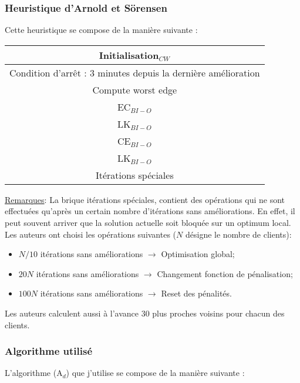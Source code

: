 \documentclass[a4paper,11pt]{article}%
\begin{document}
\subsubsection{Heuristique d'Arnold et Sörensen}

Cette heuristique se compose de la manière suivante :


\begin{center}
\begin{tabular}{|c|}

   \hline
   Initialisation$_{CW}$  \\
   \hline
   \hline
   Condition d'arrêt : 3 minutes depuis la dernière amélioration  \\
   \hline
   Compute worst edge \\
   \hline
   EC$_{BI-O}$ \\
   \hline
   LK$_{BI-O}$ \\
   \hline
   CE$_{BI-O}$ \\
   \hline
   LK$_{BI-O}$ \\
   \hline
   Itérations spéciales \\
   \hline
   \hline
   
\end{tabular}
\end{center}

\underline{Remarques}: La brique itérations spéciales, contient des opérations qui ne sont effectuées qu'après un certain nombre d'itérations sans améliorations. En effet, il peut souvent arriver que la solution actuelle soit bloquée sur un optimum local. Les auteurs ont choisi les opérations suivantes ($N$ désigne le nombre de clients):
\begin{itemize}
\item $N/10$ itérations sans améliorations $\rightarrow$ Optimisation global;
\item $20N$ itérations sans améliorations $\rightarrow$ Changement fonction de pénalisation;
\item $100N$ itérations sans améliorations $\rightarrow$ Reset des pénalités.
\end{itemize} 

Les auteurs calculent aussi à l'avance $30$ plus proches voisins pour chacun des clients.

\subsubsection{Algorithme utilisé}

L'algorithme (A$_d$) que j'utilise se compose de la manière suivante :
\end{document}
